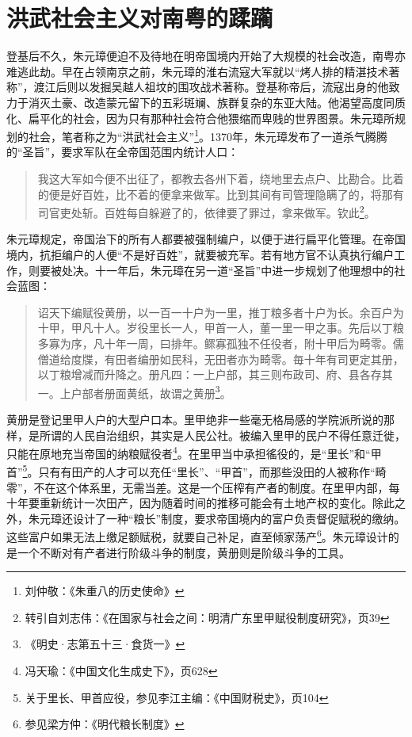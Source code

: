 \section{洪武社会主义对南粤的蹂躏}

登基后不久，朱元璋便迫不及待地在明帝国境内开始了大规模的社会改造，南粤亦难逃此劫。早在占领南京之前，朱元璋的淮右流寇大军就以“烤人排的精湛技术著称”，渡江后则以发掘吴越人祖坟的围攻战术著称。登基称帝后，流寇出身的他致力于消灭土豪、改造蒙元留下的五彩斑斓、族群复杂的东亚大陆。他渴望高度同质化、扁平化的社会，因为只有那种社会符合他猥缩而卑贱的世界图景。朱元璋所规划的社会，笔者称之为“洪武社会主义”\footnote{刘仲敬：《朱重八的历史使命》}。1370年，朱元璋发布了一道杀气腾腾的“圣旨”，要求军队在全帝国范围内统计人口：

\begin{quote}
我这大军如今便不出征了，都教去各州下着，绕地里去点户、比勘合。比着的便是好百姓，比不着的便拿来做军。比到其间有司管理隐瞒了的，将那有司官吏处斩。百姓每自躲避了的，依律要了罪过，拿来做军。钦此\footnote{转引自刘志伟：《在国家与社会之间：明清广东里甲赋役制度研究》，页39}。
\end{quote}

朱元璋规定，帝国治下的所有人都要被强制编户，以便于进行扁平化管理。在帝国境内，抗拒编户的人便“不是好百姓”，就要被充军。若有地方官不认真执行编户工作，则要被处决。十一年后，朱元璋在另一道“圣旨”中进一步规划了他理想中的社会蓝图：

\begin{quote}
	

诏天下编赋役黄册，以一百一十户为一里，推丁粮多者十户为长。余百户为十甲，甲凡十人。岁役里长一人，甲首一人，董一里一甲之事。先后以丁粮多寡为序，凡十年一周，曰排年。鳏寡孤独不任役者，附十甲后为畸零。儒僧道给度牒，有田者编册如民科，无田者亦为畸零。毎十年有司更定其册，以丁粮增减而升降之。册凡四：一上户部，其三则布政司、府、县各存其一。上户部者册面黄纸，故谓之黄册\footnote{《明史·志第五十三·食货一》}。

\end{quote}

黄册是登记里甲人户的大型户口本。里甲绝非一些毫无格局感的学院派所说的那样，是所谓的人民自治组织，其实是人民公社。被编入里甲的民户不得任意迁徙，只能在原地充当帝国的纳粮赋役者\footnote{冯天瑜：《中国文化生成史下》，页628}。在里甲当中承担徭役的，是“里长”和“甲首”\footnote{关于里长、甲首应役，参见李江主编：《中国财税史》，页104}。只有有田产的人才可以充任“里长”、“甲首”，而那些没田的人被称作“畸零”，不在这个体系里，无需当差。这是一个压榨有产者的制度。在里甲内部，每十年要重新统计一次田产，因为随着时间的推移可能会有土地产权的变化。除此之外，朱元璋还设计了一种“粮长”制度，要求帝国境内的富户负责督促赋税的缴纳。这些富户如果无法上缴足额赋税，就要自己补足，直至倾家荡产\footnote{参见梁方仲：《明代粮长制度》}。朱元璋设计的是一个不断对有产者进行阶级斗争的制度，黄册则是阶级斗争的工具。

